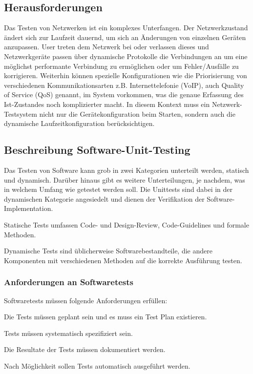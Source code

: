 \documentclass[
	ngerman,
	toc=listof, %
	toc=bibliography, %
	footnotes=multiple, %
	parskip=half, %
	numbers=noendperiod %
]{scrartcl}
\begin{document}
	\subsection{Herausforderungen}
	Das Testen von Netzwerken ist ein komplexes Unterfangen. 
	Der Netzwerkzustand ändert sich zur Laufzeit dauernd, um sich an Änderungen von einzelnen Geräten anzupassen.
	User treten dem Netzwerk bei oder verlassen dieses und Netzwerkgeräte passen über dynamische Protokolle die Verbindungen an um eine möglichst performante Verbindung zu ermöglichen oder um Fehler/Ausfälle zu korrigieren.
	Weiterhin können spezielle Konfigurationen wie die Priorisierung von verschiedenen Kommunikationsarten z.B. Internettelefonie (VoIP), auch Quality of Service (QoS) genannt, im System vorkommen, was die genaue Erfassung des Ist-Zustandes noch komplizierter macht.
	In diesem Kontext muss ein Netzwerk-Testsystem nicht nur die Gerätekonfiguration beim Starten, sondern auch die dynamische Laufzeitkonfiguration berücksichtigen.
	
	\subsection{Beschreibung Software-Unit-Testing}
	Das Testen von Software kann grob in zwei Kategorien unterteilt werden, statisch und dynamisch. 
	Darüber hinaus gibt es weitere Unterteilungen, je nachdem, was in welchem Umfang wie getestet werden soll. Die Unittests sind dabei in der dynamischen Kategorie angesiedelt und dienen der Verifikation der Software-Implementation.

	Statische Tests umfassen Code- und Design-Review, Code-Guidelines und formale Methoden.

	Dynamische Tests sind üblicherweise Softwarebestandteile, die andere Komponenten mit verschiedenen Methoden auf die korrekte Ausführung testen. 

		\subsubsection{Anforderungen an Softwaretests}
		Softwaretests müssen folgende Anforderungen erfüllen:

		Die Tests müssen geplant sein und es muss ein Test Plan existieren.

		Tests müssen systematisch spezifiziert sein.

		Die Resultate der Tests müssen dokumentiert werden.

		Nach Möglichkeit sollen Tests automatisch ausgeführt werden.
\end{document}
